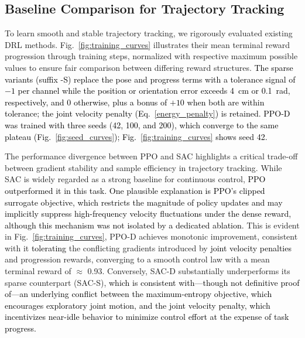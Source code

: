 \documentclass[preprint,12pt]{elsarticle}
\begin{document}
\subsection{Baseline Comparison for Trajectory Tracking}
\label{reward_ablation}
To learn smooth and stable trajectory tracking, we rigorously evaluated existing DRL methods. Fig.~\ref{fig:training_curves} illustrates their mean terminal reward progression through training steps, normalized with respective maximum possible values to ensure fair comparison between differing reward structures. \textcolor{black}{The sparse variants (suffix -S) replace the pose and progress terms with a tolerance signal of $-1$ per channel while the position or orientation error exceeds 4~cm or 0.1~rad, respectively, and $0$ otherwise, plus a bonus of $+10$ when both are within tolerance; the joint velocity penalty (Eq.~\eqref{energy_penalty}) is retained. PPO-D was trained with three seeds (42, 100, and 200), which converge to the same plateau (Fig.~\ref{fig:seed_curves}); Fig.~\ref{fig:training_curves} shows seed 42.}

The performance divergence between PPO and SAC highlights a critical trade-off between gradient stability and sample efficiency in trajectory tracking. While SAC is widely regarded as a strong baseline for continuous control, \textcolor{black}{PPO outperformed it in this task. One plausible explanation is PPO's clipped surrogate objective, which restricts the magnitude of policy updates and may implicitly suppress high-frequency velocity fluctuations under the dense reward, although this mechanism was not isolated by a dedicated ablation. } This is evident in Fig.~\ref{fig:training_curves}, PPO-D achieves monotonic improvement, consistent with it \textcolor{black}{tolerating} the conflicting gradients introduced by \textcolor{black}{joint velocity penalties} and progression rewards, converging to a smooth control law with a mean terminal reward of $\approx$ 0.93. Conversely, SAC-D substantially underperforms its sparse counterpart (SAC-S), \textcolor{black}{which is consistent with---though not definitive proof of---an underlying conflict between the maximum-entropy objective, which encourages exploratory joint motion, and the joint velocity penalty, which incentivizes near-idle behavior to minimize control effort at the expense of task progress.} 

\end{document}
